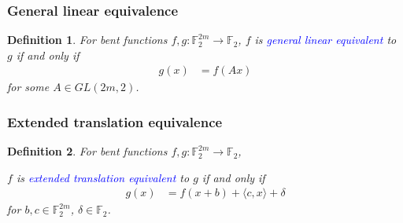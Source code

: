 \documentclass[pdf,sprung,slideColor,nocolorBG]{beamer}
\newenvironment{colortheme}[1]{
\def\ProvidesPackageRCS $##1${\relax}
\renewcommand{\ProcessOptions}{\relax}
\makeatletter

\makeatother
}{}
\newcommand{\mb}[1]{\mathbb{#1}}
\newcommand{\Emph}[1]{\emph{\textcolor{blue}{#1}}}
\newcommand{\To}{\rightarrow}
\newcommand{\F}{\mb{F}}
\newtheorem{Def}{Definition}
\begin{document}
\begin{colortheme}{jubata}
\begin{frame}
\frametitle{General linear equivalence}

\begin{Def}
For bent functions $f,g : \F_2^{2m} \To \F_2$,
$f$ is \Emph{general linear equivalent} to $g$ if and only if
\begin{align*}
g(x) &= f(A x)
\end{align*}
for some $A \in GL(2m,2)$.
\end{Def}
\end{frame}
\begin{frame}
\frametitle{Extended translation equivalence}

\begin{Def}
For bent functions $f,g : \F_2^{2m} \To \F_2$,

$f$ is \Emph{extended translation equivalent} to $g$ if and only if
\begin{align*}
g(x) &= f(x + b) + \langle c, x \rangle + \delta
\end{align*}
for $b, c \in \F_2^{2m}$, $\delta \in \F_2$.
\end{Def}
\end{frame}
\end{colortheme}
\end{document}
